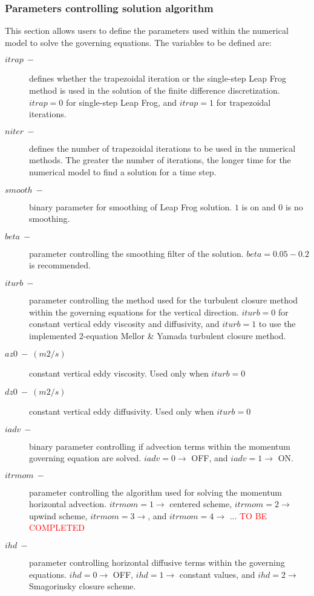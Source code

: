 \subsubsection{Parameters controlling solution algorithm}
This section allows users to define the parameters used within the numerical model to solve the governing equations. The variables to be defined are: 

\begin{description}
    \item [$itrap\ -$] defines whether the trapezoidal iteration or the single-step Leap Frog method is used in the solution of the finite difference discretization. $itrap = 0$ for single-step Leap Frog, and $itrap = 1$ for trapezoidal iterations.
    \item [$niter\ -$] defines the number of trapezoidal iterations to be used in the numerical methods. The greater the number of iterations, the longer time for the numerical model to find a solution for a time step. 
    \item [$smooth\ -$] binary parameter for smoothing of Leap Frog solution. $1$ is on and $0$ is no smoothing.
    \item [$beta\ -$] parameter controlling the smoothing filter of the solution. $beta = 0.05-0.2$ is recommended.
    \item [$iturb\ -$] parameter controlling the method used for the turbulent closure method within the governing equations for the vertical direction. $iturb = 0$ for constant vertical eddy viscosity and diffusivity, and $iturb = 1$ to use the implemented 2-equation Mellor \& Yamada turbulent closure method.
    \item [$az0\ -\ (m2/s)$] constant vertical eddy viscosity. Used only when $iturb = 0$
    \item [$dz0\ -\ (m2/s)$] constant vertical eddy diffusivity. Used only when $iturb = 0$
    \item [$iadv\ -$] binary parameter controlling if advection terms within the momentum governing equation are solved. $iadv = 0 \rightarrow$ OFF, and $iadv = 1 \rightarrow$ ON.
    \item [$itrmom\ -$] parameter controlling the algorithm used for solving the momentum horizontal advection. $itrmom = 1 \rightarrow$ centered scheme, $itrmom = 2 \rightarrow$ upwind scheme, $itrmom = 3 \rightarrow $, and $itrmom = 4 \rightarrow $ ... \textcolor{red}{TO BE COMPLETED}
    \item [$ihd\ -$] parameter controlling horizontal diffusive terms within the governing equations. $ihd = 0 \rightarrow$ OFF, $ihd = 1 \rightarrow$ constant values, and $ihd = 2 \rightarrow $ Smagorinsky closure scheme.

\end{description}

